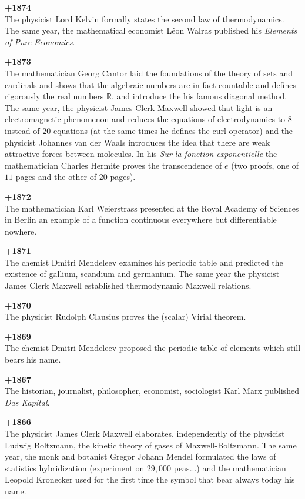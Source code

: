 \textbf{+1874}\\
The physicist Lord Kelvin formally states the second law of thermodynamics. The same year, the mathematical economist Léon Walras published his \textit{Elements of Pure Economics}.

\textbf{+1873}\\
The mathematician Georg Cantor laid the foundations of the theory of sets and cardinals and shows that the algebraic numbers are in fact countable and defines rigorously the real numbers $\mathbb{R}$, and introduce the his famous diagonal method. The same year, the physicist James Clerk Maxwell showed that light is an electromagnetic phenomenon and reduces the equations of electrodynamics to $8$ instead of $20$ equations (at the same times he defines the curl operator) and the physicist Johannes van der Waals introduces the idea that there are weak attractive forces between molecules. In his \textit{Sur la fonction exponentielle} the mathematician Charles Hermite proves the transcendence of $e$ (two proofs, one of $11$ pages and the other of $20$ pages).

\textbf{+1872}\\
The mathematician Karl Weierstrass presented at the Royal Academy of Sciences in Berlin an example of a function continuous everywhere but differentiable nowhere.

\textbf{+1871}\\
The chemist Dmitri Mendeleev examines his periodic table and predicted the existence of gallium, scandium and germanium. The same year the physicist James Clerk Maxwell established thermodynamic Maxwell relations. 

\textbf{+1870}\\
The physicist Rudolph Clausius proves the (scalar) Virial theorem.

\textbf{+1869}\\
The chemist Dmitri Mendeleev proposed the periodic table of elements which still bears his name.

\textbf{+1867}\\
The historian, journalist, philosopher, economist, sociologist Karl Marx published \textit{Das Kapital}. 

\textbf{+1866}\\
The physicist James Clerk Maxwell elaborates, independently of the physicist Ludwig Boltzmann, the kinetic theory of gases of Maxwell-Boltzmann. The same year, the monk and botanist Gregor Johann Mendel formulated the laws of statistics hybridization (experiment on $29,000$ peas...) and the mathematician Leopold Kronecker used for the first time the symbol that bear always today his name.

